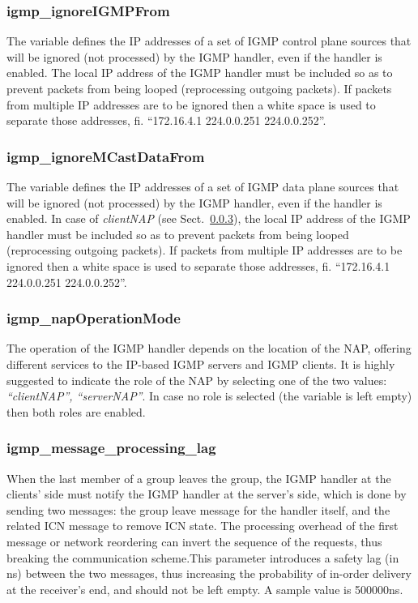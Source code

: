 \documentclass[a4paper,11pt,titlepage]{report}
\begin{document}
\subsubsection{igmp\_ignoreIGMPFrom} 
The variable defines the IP addresses of a set of IGMP control plane sources that will be ignored (not processed) by the IGMP handler, even if the handler is enabled. The local IP address of the IGMP handler must be included so as to prevent packets from being looped (reprocessing outgoing packets). If packets from multiple IP addresses are to be ignored then a white space is used to separate those addresses, fi. ``172.16.4.1 224.0.0.251 224.0.0.252''.

\subsubsection{igmp\_ignoreMCastDataFrom}
The variable defines the IP addresses of a set of IGMP data plane sources that will be ignored (not processed) by the IGMP handler, even if the handler is enabled. In case of \textit{clientNAP} (see Sect.~\ref{intro_vars_igmp_role}), the local IP address of the IGMP handler must be included so as to prevent packets from being looped (reprocessing outgoing packets). If packets from multiple IP addresses are to be ignored then a white space is used to separate those addresses, fi. ``172.16.4.1 224.0.0.251 224.0.0.252''.
\subsubsection{igmp\_napOperationMode}\label{intro_vars_igmp_role}
The operation of the IGMP handler depends on the location of the \ac{NAP}, offering different services to the IP-based IGMP servers and IGMP clients. It is highly suggested to indicate the role of the \ac{NAP} by selecting one of the two values: \emph{``clientNAP'', ``serverNAP''}. In case no role is selected (the variable is left empty) then both roles are enabled.

\subsubsection{igmp\_message\_processing\_lag}
When the last member
of a group leaves the group, the IGMP handler at the clients' side must notify the IGMP handler at the server's side, which is done by sending two messages: the group leave message for the handler itself, and the related ICN message to remove ICN state. The processing overhead of the first message or network reordering can invert the sequence of the requests, thus breaking the communication scheme.This parameter introduces a safety lag (in ns) between the two messages, thus increasing the probability of in-order delivery at the receiver's end, and should not be left empty. A sample value is 500000ns.
\end{document}
